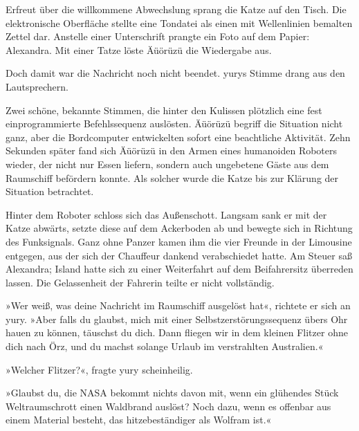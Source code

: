 
Erfreut über die willkommene Abwechslung sprang die Katze auf den Tisch. Die elektronische Oberfläche stellte eine Tondatei als einen mit Wellenlinien bemalten Zettel dar. Anstelle einer Unterschrift prangte ein Foto auf dem Papier: Alexandra. Mit einer Tatze löste Äüörüzü die Wiedergabe aus.


Doch damit war die Nachricht noch nicht beendet. yurys Stimme drang aus den Lautsprechern.


Zwei schöne, bekannte Stimmen, die hinter den Kulissen plötzlich eine fest einprogrammierte Befehlssequenz auslösten. Äüörüzü begriff die Situation nicht ganz, aber die Bordcomputer entwickelten sofort eine beachtliche Aktivität. Zehn Sekunden später fand sich Äüörüzü in den Armen eines humanoiden Roboters wieder, der nicht nur Essen liefern, sondern auch ungebetene Gäste aus dem Raumschiff befördern konnte. Als solcher wurde die Katze bis zur Klärung der Situation betrachtet.

Hinter dem Roboter schloss sich das Außenschott. Langsam sank er mit der Katze abwärts, setzte diese auf dem Ackerboden ab und bewegte sich in Richtung des Funksignals. Ganz ohne Panzer kamen ihm die vier Freunde in der Limousine entgegen, aus der sich der Chauffeur dankend verabschiedet hatte. Am Steuer saß Alexandra; Island hatte sich zu einer Weiterfahrt auf dem Beifahrersitz überreden lassen. Die Gelassenheit der Fahrerin teilte er nicht vollständig.

»Wer weiß, was deine Nachricht im Raumschiff ausgelöst hat«, richtete er sich an yury. »Aber falls du glaubst, mich mit einer Selbstzerstörungssequenz übers Ohr hauen zu können, täuschst du dich. Dann fliegen wir in dem kleinen Flitzer ohne dich nach Örz, und du machst solange Urlaub im verstrahlten Australien.«

»Welcher Flitzer?«, fragte yury scheinheilig.

»Glaubst du, die NASA bekommt nichts davon mit, wenn ein glühendes Stück Weltraumschrott einen Waldbrand auslöst? Noch dazu, wenn es offenbar aus einem Material besteht, das hitzebeständiger als Wolfram ist.«

